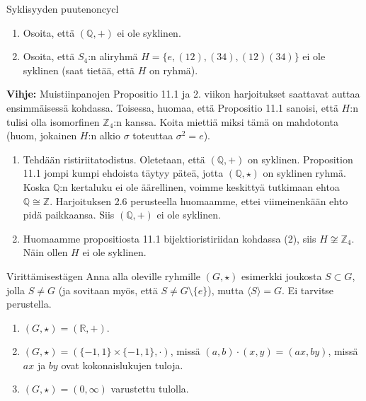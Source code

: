\documentclass[11pt,a4paper]{amsart}
\newcommand{\Z}{\mathbb{Z}}
\newcommand{\R}{\mathbb{R}}
\newcommand{\Q}{\mathbb{Q}}
\newcommand{\1}{\mathbf{1}}
\begin{document}
\begin{Exercises}{Syklisyyden puute}{noncycl}
\begin{enumerate}
\item Osoita, että $(\Q,+)$ ei ole syklinen.
\item Osoita, että $S_4$:n aliryhmä $H=\{e,(12),(34),(12)(34)\}$ ei ole syklinen (saat tietää, että $H$ on ryhmä).
\end{enumerate}
{\bf Vihje: } Muistiinpanojen Propositio 11.1 ja 2. viikon harjoitukset saattavat auttaa ensimmäisessä kohdassa. Toisessa, huomaa, että Propositio 11.1 sanoisi, että $H$:n tulisi olla isomorfinen $\Z_4$:n kanssa. Koita miettiä miksi tämä on mahdotonta (huom, jokainen $H$:n alkio $\sigma$ toteuttaa $\sigma^2=e$).
\end{Exercises}

\begin{Solution}
  \begin{enumerate}
    \item  Tehdään ristiriitatodistus. Oletetaan, että $(\mathbb{Q},+)$ on syklinen. Proposition 11.1 jompi kumpi ehdoista täytyy päteä, jotta $(\mathbb{Q},\star)$ on syklinen ryhmä. Koska $\mathbb{Q}$:n kertaluku ei ole äärellinen, voimme keskittyä tutkimaan ehtoa $\mathbb{Q} \cong \mathbb{Z}$. Harjoituksen 2.6 perusteella huomaamme, ettei viimeinenkään ehto pidä paikkaansa. Siis $(\mathbb{Q},+)$ ei ole syklinen.
    \item Huomaamme propositiosta 11.1 bijektioristiriidan kohdassa (2), siis $H \not \cong \mathbb{Z}_4$. Näin ollen $H$ ei ole syklinen.
  \end{enumerate}
\end{Solution}

\begin{Exercises}{Virittämisestä}{gen}
Anna alla oleville ryhmille $(G,\star)$ esimerkki joukosta $S\subset G$, jolla $S\neq G$ (ja sovitaan myös, että $S\neq G\setminus \{e\}$), mutta $\langle S\rangle=G$. Ei tarvitse perustella.
\begin{enumerate}
\item $(G,\star)=(\R,+)$.
\item $(G,\star)=(\{-1,1\}\times \{-1,1\},\cdot)$, missä $(a,b)\cdot (x,y)=(ax,by)$, missä $ax$ ja $by$ ovat kokonaislukujen tuloja.
\item $(G,\star)=(0,\infty)$ varustettu tulolla.
\end{enumerate}
\end{Exercises}
\end{document}
